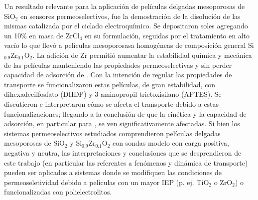  Un resultado relevante para la aplicación de películas delgadas mesoporosas de SiO$_2$ en sensores permeoselectivos, fue la demostración de la disolución de las mismas  catalizada por el ciclado electroquímico. Se depositaron soles agregando un 10\% en masa de ZrCl$_4$ en su formulación, seguidas por el tratamiento en alto vacío lo que llevó a películas mesoporosasa homogéneas de composición general Si$_{0.9}$Zr$_{0.1}$O$_2$. La adición de Zr permitió aumentar la estabilidad química y mecánica de las películas manteniendo las propiedades permeoselectivas y sin perder capacidad de adsorción de \aminorutenio. Con la intención de regular las propiedades de transporte se funcionalizaron estas películas, de gran estabilidad, con dihexadecilfosfato (DHDP) y 3-aminopropil trietoxisilano (APTES). Se discutieron e interpretaron cómo se afecta el transporte debido a estas funcionalizaciones; llegando a la conclusión de que la cinética y la capacidad de adsorción, en particular para \ru, se ven significativamente afectadas. Si bien los sistemas permeoselectivos estudiados comprendieron películas delgadas mesoporosas de SiO$_2$ y Si$_{0.9}$Zr$_{0.1}$O$_2$ con sondas modelo con carga positiva, negativa y neutra, las interpretaciones y conclusiones que se desprendieron de este trabajo (en particular las referentes a  fenómenos y dinámica de transporte) pueden ser aplicados a sistemas donde se modifiquen las condiciones de permeoseletividad debido a películas con un mayor IEP (p. ej. TiO$_2$ o ZrO$_2$) o funcionalizadas con polielectrolitos. 
 
